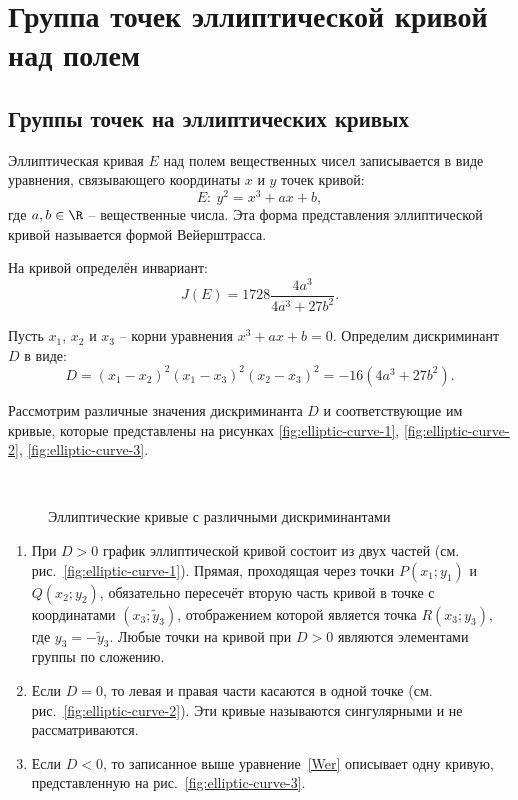 \section{Группа точек эллиптической кривой над полем}\label{section-math-ec-groups}

\subsection{Группы точек на эллиптических кривых}

Эллиптическая кривая $E$ над полем вещественных чисел записывается в виде уравнения, связывающего координаты $x$ и $y$ точек кривой:
\begin{equation}
    E: ~ y^{2} = x^{3} + ax + b,
    \label{Wer}
\end{equation}
где $a,b \in \R$ -- вещественные числа. Эта форма представления эллиптической кривой называется формой Вейерштрасса.

На кривой определён инвариант:
\begin{equation}
    J(E)=1728\frac{4a^{3} }{4a^{3} +27b^{2} }.
\end{equation}

Пусть $x_{1}$, $x_{2}$ и $x_{3}$ -- корни уравнения $x^3 + a x + b = 0$. Определим дискриминант $D$ в виде:
    \[ D =(x_1 - x_2)^2 (x_1 - x_3)^2 (x_2 - x_3)^2 = - 16(4 a^3 + 27 b^2). \]

Рассмотрим различные значения дискриминанта $D$ и соответствующие им кривые, которые представлены на рисунках \ref{fig:elliptic-curve-1}, \ref{fig:elliptic-curve-2}, \ref{fig:elliptic-curve-3}.

\begin{figure}[thb]
	\centering 
	~~~~
	~~~~
	\caption{Эллиптические кривые с различными дискриминантами}
\end{figure}

\begin{enumerate}
    \item При $D>0$ график эллиптической кривой состоит из двух частей (см. рис.~\ref{fig:elliptic-curve-1}). Прямая, проходящая через точки $P(x_1; y_1)$ и $Q(x_2; y_2)$, обязательно пересечёт вторую часть кривой в точке с координатами $(x_3; \widetilde{y}_3)$, отображением которой является точка $R(x_3; y_3)$, где $y_3 = - \widetilde{y}_3$. Любые точки на кривой при $D>0$ являются элементами группы по сложению.
    \item Если $D=0$, то левая и правая части касаются в одной точке (см. рис.~\ref{fig:elliptic-curve-2}). Эти кривые называются сингулярными и не рассматриваются.
    \item Если $D<0$, то записанное выше уравнение~\ref{Wer} описывает одну кривую, представленную на рис.~\ref{fig:elliptic-curve-3}.
\end{enumerate}

